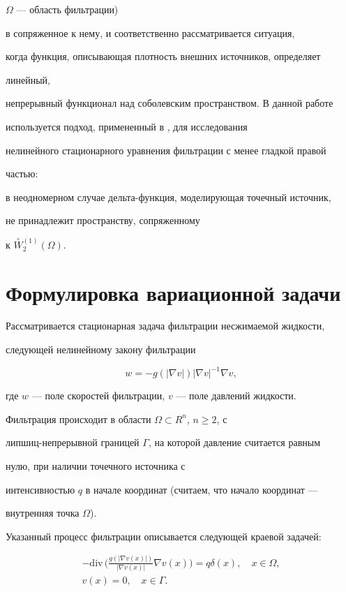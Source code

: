 $\Omega$ --- область фильтрации)


в сопряженное к нему, и соответственно рассматривается ситуация,


когда функция, описывающая плотность внешних источников, определяет


линейный,


непрерывный функционал над соболевским пространством. В данной работе


используется подход, примененный в \cite{KL_73_IV}, для исследования


нелинейного стационарного уравнения фильтрации с менее гладкой правой


частью:


в неодномерном случае дельта-функция, моделирующая точечный источник,


не принадлежит пространству, сопряженному


к $\overset{\circ}{W}{}^{(1)}_{2} (\Omega)$.








\section{Формулировка вариационной задачи}





Рассматривается стационарная задача фильтрации несжимаемой жидкости,


следующей нелинейному закону фильтрации


$$


w = -g(|\nabla v|) {|\nabla v|}^{-1} \nabla v,


$$


где $w$ --- поле скоростей фильтрации, $v$ --- поле давлений жидкости.


Фильтрация происходит в области $\Omega \subset R^{n}$, $n \geq 2$, с


липшиц-непрерывной границей $\Gamma$, на которой давление считается равным


нулю, при наличии точечного источника с


интенсивностью $q$ в начале координат (считаем, что начало координат ---


внутренняя точка $\Omega$).


Указанный процесс фильтрации описывается следующей краевой задачей:


\begin{gather}


-\mathrm{div}\,


\bigg(\frac {g(|\nabla v(x)|) }{|\nabla v(x)|} \nabla v(x) \bigg)


= q \delta (x), \quad x \in \Omega,


\label{Omega_1}\\


%


v(x)=0, \quad x \in \Gamma.


\label{Omega_2}


\end{gather}


